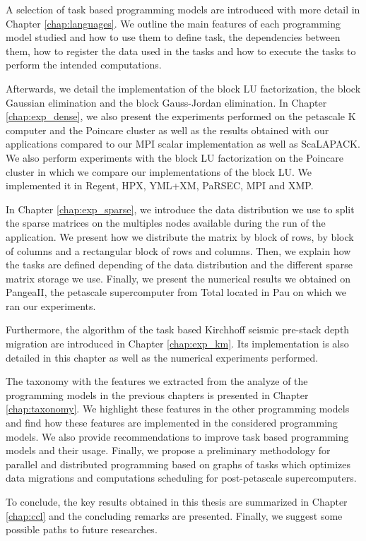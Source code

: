 A selection of task based programming models are introduced with more detail in Chapter \ref{chap:languages}.
We outline the main features of each programming model studied and how to use them to define task, the dependencies between them, how to register the data used in the tasks and how to execute the tasks to perform the intended computations.

Afterwards, we detail the implementation of the block LU factorization, the block Gaussian elimination and the block Gauss-Jordan elimination.
In Chapter \ref{chap:exp_dense}, we also present the experiments performed on the petascale K computer and the Poincare cluster as well as the results obtained with our applications compared to our MPI scalar implementation as well as ScaLAPACK.
We also perform experiments with the block LU factorization on the Poincare cluster in which we compare our implementations of the block LU.
We implemented it in Regent, HPX, YML+XM, PaRSEC, MPI and XMP.

In Chapter \ref{chap:exp_sparse}, we introduce the data distribution we use to split the sparse matrices on the multiples nodes available during the run of the application.
We present how we distribute the matrix by block of rows, by block of columns and a rectangular block of rows and columns.
Then, we explain how the tasks are defined depending of the data distribution and the different sparse matrix storage we use.
Finally, we present the numerical results we obtained on PangeaII, the petascale supercomputer from Total located in Pau on which we ran our experiments.

Furthermore, the algorithm of the task based Kirchhoff seismic pre-stack depth migration are introduced in Chapter \ref{chap:exp_km}.
Its implementation is also detailed in this chapter as well as the numerical experiments performed.

The taxonomy with the features we extracted from the analyze of the programming models in the previous chapters is presented in Chapter \ref{chap:taxonomy}.
We highlight these features in the other programming models and find how these features are implemented in the considered programming models.
We also provide recommendations to improve task based programming models and their usage.
Finally, we propose a preliminary methodology for parallel and distributed programming based on graphs of tasks which optimizes data migrations and computations scheduling for post-petascale supercomputers.

To conclude, the key results obtained in this thesis are summarized in Chapter \ref{chap:ccl} and the concluding remarks are presented.
Finally, we suggest some possible paths to future researches.
